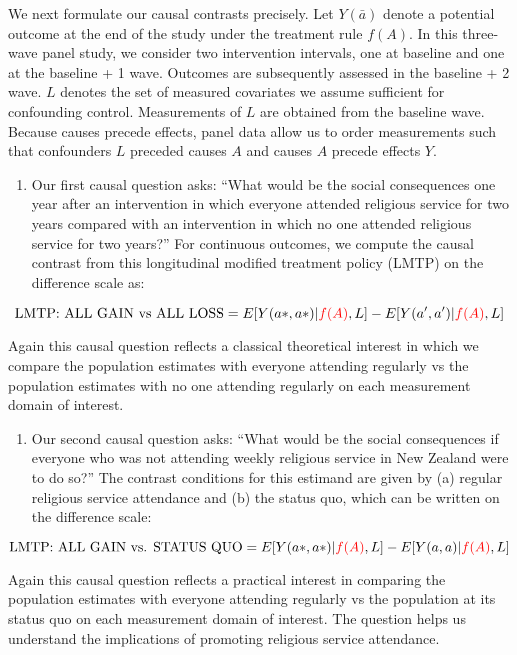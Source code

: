 \documentclass[
  single column]{article}
\providecommand{\tightlist}{%
  \setlength{\itemsep}{0pt}\setlength{\parskip}{0pt}}\usepackage{longtable,booktabs,array}
\begin{document}
We next formulate our causal contrasts precisely. Let \(Y(\bar{a})\)
denote a potential outcome at the end of the study under the treatment
rule \(f(A)\). In this three-wave panel study, we consider two
intervention intervals, one at baseline and one at the baseline + 1
wave. Outcomes are subsequently assessed in the baseline + 2 wave. \(L\)
denotes the set of measured covariates we assume sufficient for
confounding control. Measurements of \(L\) are obtained from the
baseline wave. Because causes precede effects, panel data allow us to
order measurements such that confounders \(L\) preceded causes \(A\) and
causes \(A\) precede effects \(Y\).

\begin{enumerate}
\def\labelenumi{\arabic{enumi}.}
\tightlist
\item
  Our first causal question asks: ``What would be the social
  consequences one year after an intervention in which everyone attended
  religious service for two years compared with an intervention in which
  no one attended religious service for two years?'' For continuous
  outcomes, we compute the causal contrast from this longitudinal
  modified treatment policy (LMTP) on the difference scale as:
\end{enumerate}

\[ \text{LMTP: ALL GAIN vs ALL LOSS} = E[Y(a*,a*)|\textcolor{red}{f(A)},L] - E[Y(a^\prime,a^\prime)|\textcolor{red}{f(A)},L] \]

Again this causal question reflects a classical theoretical interest in
which we compare the population estimates with everyone attending
regularly vs the population estimates with no one attending regularly on
each measurement domain of interest.

\begin{enumerate}
\def\labelenumi{\arabic{enumi}.}
\setcounter{enumi}{1}
\tightlist
\item
  Our second causal question asks: ``What would be the social
  consequences if everyone who was not attending weekly religious
  service in New Zealand were to do so?'' The contrast conditions for
  this estimand are given by (a) regular religious service attendance
  and (b) the status quo, which can be written on the difference scale:
\end{enumerate}

\[  \text{LMTP: ALL GAIN vs. STATUS QUO}  = E[Y(a*,a*)|\textcolor{red}{f(A)},L] - E[Y(a,a)|\textcolor{red}{f(A)},L] \]

Again this causal question reflects a practical interest in comparing
the population estimates with everyone attending regularly vs the
population at its status quo on each measurement domain of interest. The
question helps us understand the implications of promoting religious
service attendance.
\end{document}
